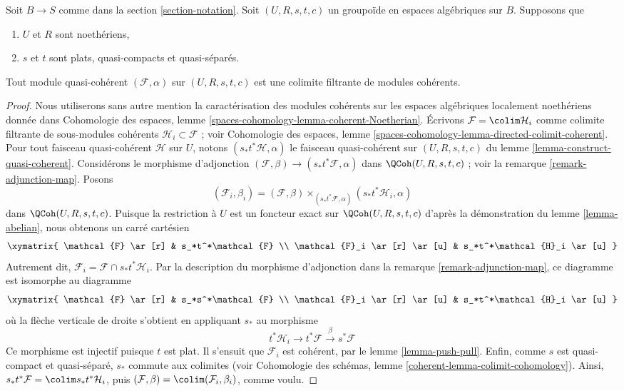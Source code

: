 \begin{lemma}
\label{lemma-colimit-coherent}
Soit $B \to S$ comme dans la section \ref{section-notation}. Soit $(U, R, s, t, c)$ un groupoïde en espaces algébriques sur $B$. Supposons que
\begin{enumerate}
\item $U$ et $R$ sont noethériens,
\item $s$ et $t$ sont plats, quasi-compacts et quasi-séparés.
\end{enumerate}
Tout module quasi-cohérent $(\mathcal{F}, \alpha)$ sur $(U, R, s, t, c)$ est une colimite filtrante de modules cohérents.
\end{lemma}

\begin{proof}
Nous utiliserons sans autre mention la caractérisation des modules cohérents sur les espaces algébriques localement noethériens donnée dans Cohomologie des espaces, lemme \ref{spaces-cohomology-lemma-coherent-Noetherian}. Écrivons $\mathcal{F} = \colim \mathcal{H}_i$ comme colimite filtrante de sous-modules cohérents $\mathcal{H}_i \subset \mathcal{F}$ ; voir Cohomologie des espaces, lemme \ref{spaces-cohomology-lemma-directed-colimit-coherent}. Pour tout faisceau quasi-cohérent $\mathcal{H}$ sur $U$, notons $(s_*t^*\mathcal{H}, \alpha)$ le faisceau quasi-cohérent sur $(U, R, s, t, c)$ du lemme \ref{lemma-construct-quasi-coherent}. Considérons le morphisme d'adjonction $(\mathcal{F}, \beta) \to (s_*t^*\mathcal{F}, \alpha)$ dans $\QCoh(U, R, s, t, c)$ ; voir la remarque \ref{remark-adjunction-map}. Posons
$$
(\mathcal{F}_i, \beta_i) =
(\mathcal{F}, \beta)
\times_{(s_*t^*\mathcal{F}, \alpha)}
(s_*t^*\mathcal{H}_i, \alpha)
$$
dans $\QCoh(U, R, s, t, c)$. Puisque la restriction à $U$ est un foncteur exact sur $\QCoh(U, R, s, t, c)$ d'après la démonstration du lemme \ref{lemma-abelian}, nous obtenons un carré cartésien
$$
\xymatrix{
\mathcal{F} \ar[r] & s_*t^*\mathcal{F} \\
\mathcal{F}_i \ar[r] \ar[u] & s_*t^*\mathcal{H}_i \ar[u]
}
$$
Autrement dit, $\mathcal{F}_i = \mathcal{F} \cap s_*t^*\mathcal{H}_i$. Par la description du morphisme d'adjonction dans la remarque \ref{remark-adjunction-map}, ce diagramme est isomorphe au diagramme
$$
\xymatrix{
\mathcal{F} \ar[r] & s_*s^*\mathcal{F} \\
\mathcal{F}_i \ar[r] \ar[u] & s_*t^*\mathcal{H}_i \ar[u]
}
$$
où la flèche verticale de droite s'obtient en appliquant $s_*$ au morphisme
$$
t^*\mathcal{H}_i \to t^*\mathcal{F} \xrightarrow{\beta} s^*\mathcal{F}
$$
Ce morphisme est injectif puisque $t$ est plat. Il s'ensuit que $\mathcal{F}_i$ est cohérent, par le lemme \ref{lemma-push-pull}. Enfin, comme $s$ est quasi-compact et quasi-séparé, $s_*$ commute aux colimites (voir Cohomologie des schémas, lemme \ref{coherent-lemma-colimit-cohomology}). Ainsi, $s_*t^*\mathcal{F} = \colim s_*t^*\mathcal{H}_i$, puis $(\mathcal{F}, \beta) = \colim (\mathcal{F}_i, \beta_i)$, comme voulu.
\end{proof}








